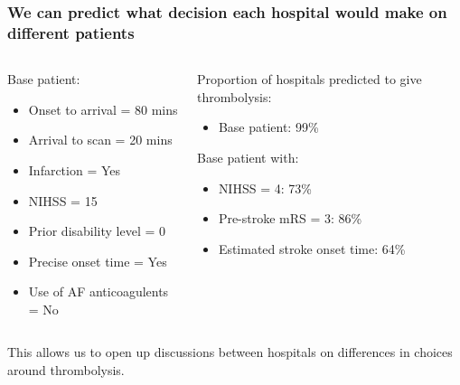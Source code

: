 \begin{frame}
\frametitle{We can predict what decision each hospital would make on different patients}

\vspace{3mm}

\begin{columns}[t]
    \begin{column}{0.45\textwidth}
        Base patient:
        \begin{itemize}
            \footnotesize
            \item Onset to arrival = 80 mins
            \item Arrival to scan = 20 mins
            \item Infarction = Yes
            \item NIHSS = 15
            \item Prior disability level = 0
            \item Precise onset time = Yes
            \item Use of AF anticoagulents = No
        \end{itemize}
    \end{column}
    
    \begin{column}{0.5\textwidth}
    \color{teal}
    Proportion of hospitals predicted to give thrombolysis:
    \footnotesize
    \begin{itemize}
        \color{teal}
        \item Base patient: 99\%
    \end{itemize}
    \vspace{3mm}
    \normalfont
    \color{red}
    \normalsize
    Base patient with:
    \footnotesize
    \begin{itemize}
        \color{red}
        \item NIHSS = 4: 73\%
        \item Pre-stroke mRS = 3: 86\%
        \item Estimated stroke onset time: 64\%
    \end{itemize}
    \end{column}

\end{columns}

\vspace{7mm}
This allows us to open up discussions between hospitals on differences in choices around thrombolysis.
\end{frame}
